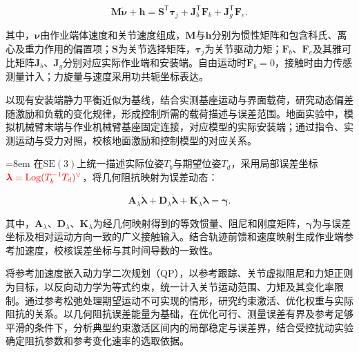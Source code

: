 \documentclass[UTF8,a4paper,zihao=-4,fontset=fandol]{ctexart}
\newcommand{\rev}[1]{{\color{red}#1}}
\newcommand{\SE}{\mathrm{SE}(3)}
\begin{document}
{\color{red}\begin{equation}
 \bm M\dot{\bm\nu}+\bm h
 =\bm S^{\mathsf T}\bm\tau_j
 +\bm J_b^{\mathsf T}\bm F_b
 +\bm J_g^{\mathsf T}\bm F_e .
 \label{eq:reverse_dynamics}
\end{equation}}

\rev{其中，$\bm\nu$由作业端体速度和关节速度组成，}$\bm M$\rev{与}$\bm h$\rev{分别为惯性矩阵和包含科氏、离心及重力作用的偏置项；$\bm S$为关节选择矩阵，}$\bm\tau_j$\rev{为关节驱动}力矩\rev{；}$\bm F_b$\rev{、}$\bm F_e$\rev{及其雅可比矩阵$\bm J_b$、}$\bm J_g$\rev{分别对应实际作业端和}安装端\rev{。自由运动时}$\bm F_b=0$\rev{，接触时由力传感测量计入；力旋量}与\rev{速度采用功共轭坐标表达。}

以现有\rev{安装端}静力平衡近似为基线，结合\rev{实测基座}运动与\rev{界面载荷}，研究动态\rev{偏差随激励和负载}的\rev{变化规律，形成}控制\rev{所需}的\rev{载荷描述}与\rev{误差范围}。地面实验中，\rev{模拟机械臂末端与}作业机械臂基座固定连接，对应模型的实际安装端；\rev{通过指令、实测}运动与\rev{受力对照}，校核地面激励\rev{和}控制模型的对应关系。

\begingroup{}\emergencystretch=8em
\rev{在}$\SE$\rev{上统一描述}实际\rev{位姿}$T_b$与期望位姿$T_d$，采用\rev{局部}误差\rev{坐标}\allowbreak$\color{red}\bm\lambda=\operatorname{Log}(T_b^{-1}T_d)^\vee$，\rev{将}几何阻抗\rev{映射}为误差动态\cite{kim2025}：
\par\endgroup

\begin{equation}
 \bm A_\lambda\ddot{\bm\lambda}
 +\bm D_\lambda\dot{\bm\lambda}
 +\bm K_\lambda\bm\lambda
 =\bm\gamma .
 \label{eq:impedance}
\end{equation}

\rev{其中}，$\bm A_\lambda$、$\bm D_\lambda$\rev{、}$\bm K_\lambda$为\rev{经几何映射得到的等效}惯量、阻尼和刚度矩阵，$\bm\gamma$为\rev{与误差坐标及}相对运动方向\rev{一致}的\rev{广义接触输入}。\rev{结合轨迹前馈和}速度映射\rev{生成作业端}参考加速度，校核\rev{误差坐标与其时间导数}的\rev{一致性}。

将\rev{参考加速度嵌入}动力学二次规划\rev{（QP）}，以\rev{参考跟踪、}关节虚拟阻尼和力矩正则为目标，\rev{以反向}动力学\rev{为}等式约束，\rev{统一计入}关节\rev{运动范围、力矩及其变化率限制}。\rev{通过}参考\rev{松弛处理期望运动}不可实现\rev{的情形}，\rev{研究约束激活、优化权重与}实际阻抗的\rev{关系}。\rev{以几何阻抗误差能量为基础，}在\rev{优化}可行\rev{、测量}误差有界\rev{及参考足够平滑}的条件下，分析\rev{典型约束激活区间内}的局部稳定与误差界，结合\rev{受控扰动实验确定阻抗参数和参考变化速率}的\rev{选取依据}。
\end{document}
